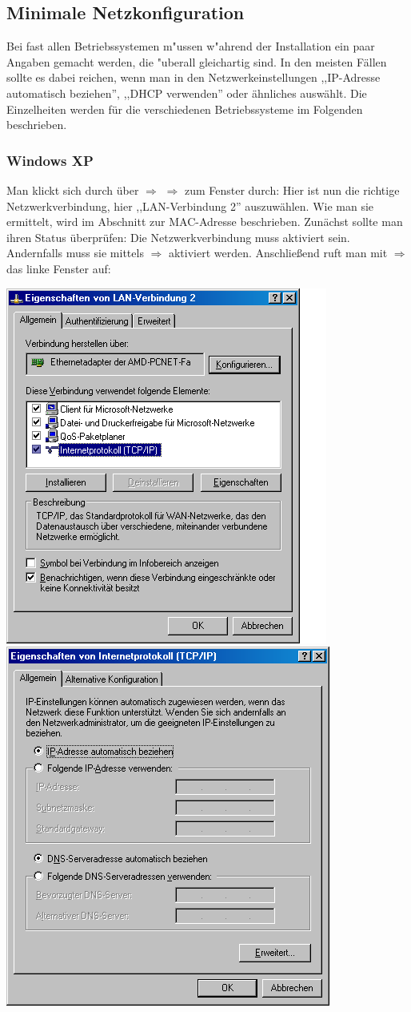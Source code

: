 
\subsection{Minimale Netzkonfiguration}
Bei fast allen Betriebssystemen m"ussen w"ahrend der Installation ein paar
Angaben gemacht werden, die "uberall gleichartig sind. In den meisten
Fällen sollte es dabei reichen, wenn man in den Netzwerkeinstellungen
,,IP-Adresse automatisch beziehen'', ,,DHCP verwenden'' oder ähnliches
auswählt. Die Einzelheiten werden für die verschiedenen
Betriebssysteme im Folgenden beschrieben.
\subsubsection{Windows XP}
Man klickt sich durch  über  $\Rightarrow$
 $\Rightarrow$  zum Fenster
 durch:
Hier ist nun die richtige Netzwerkverbindung, hier ,,LAN-Verbindung 2'' auszuwählen. Wie man sie
ermittelt, wird im Abschnitt zur MAC-Adresse beschrieben. Zunächst
sollte man ihren Status überprüfen:  Die Netzwerkverbindung muss
aktiviert sein. Andernfalls muss sie mittels
$\Rightarrow$ aktiviert
werden.  Anschließend ruft man mit
$\Rightarrow$ das linke Fenster auf:  
\begin{center}
\includegraphics[width=0.48\linewidth]{bilder/eigenschaften_xp}
\includegraphics[width=0.48\linewidth]{bilder/dhcp_xp}    
\end{center}
 

